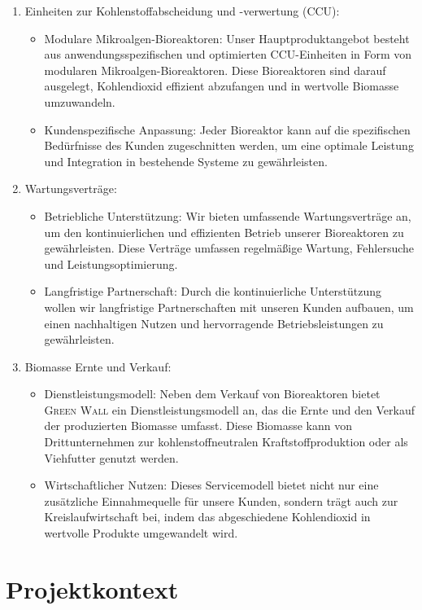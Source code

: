         \begin{enumerate}
            \item Einheiten zur Kohlenstoffabscheidung und -verwertung (CCU):
            \begin{itemize}
                \item Modulare Mikroalgen-Bioreaktoren: Unser Hauptproduktangebot besteht aus anwendungsspezifischen und optimierten CCU-Einheiten in Form von modularen Mikroalgen-Bioreaktoren.
                Diese Bioreaktoren sind darauf ausgelegt, Kohlendioxid effizient abzufangen und in wertvolle Biomasse umzuwandeln.
                \item Kundenspezifische Anpassung: Jeder Bioreaktor kann auf die spezifischen Bedürfnisse des Kunden zugeschnitten werden, um eine optimale Leistung und Integration in bestehende Systeme zu gewährleisten.
            \end{itemize}
            \item Wartungsverträge:
            \begin{itemize}
                \item Betriebliche Unterstützung: Wir bieten umfassende Wartungsverträge an, um den kontinuierlichen und effizienten Betrieb unserer Bioreaktoren zu gewährleisten.
                Diese Verträge umfassen regelmäßige Wartung, Fehlersuche und Leistungsoptimierung.
                \item Langfristige Partnerschaft: Durch die kontinuierliche Unterstützung wollen wir langfristige Partnerschaften mit unseren Kunden aufbauen, um einen nachhaltigen Nutzen und hervorragende Betriebsleistungen zu gewährleisten.
            \end{itemize}
            \item Biomasse Ernte und Verkauf:
            \begin{itemize}
                \item Dienstleistungsmodell: Neben dem Verkauf von Bioreaktoren bietet \textsc{Green Wall} ein Dienstleistungsmodell an, das die Ernte und den Verkauf der produzierten Biomasse umfasst.
                Diese Biomasse kann von Drittunternehmen zur kohlenstoffneutralen Kraftstoffproduktion oder als Viehfutter genutzt werden.
                \item Wirtschaftlicher Nutzen: Dieses Servicemodell bietet nicht nur eine zusätzliche Einnahmequelle für unsere Kunden, sondern trägt auch zur Kreislaufwirtschaft bei, indem das abgeschiedene Kohlendioxid in wertvolle Produkte umgewandelt wird.
            \end{itemize}
        \end{enumerate}

    \section{Projektkontext}